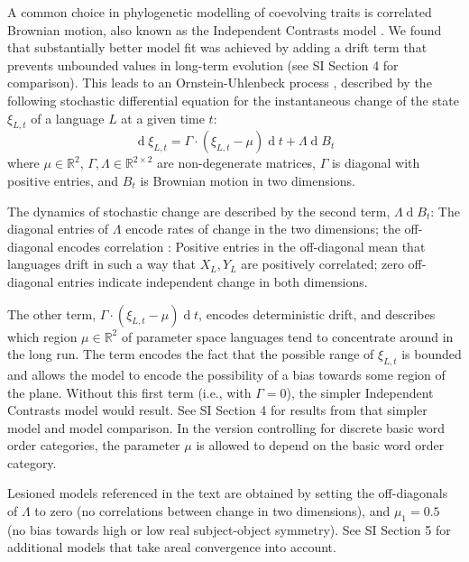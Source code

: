 \documentclass[11pt,a4paper]{article}
\begin{document}
A common choice in phylogenetic modelling of coevolving traits is correlated Brownian motion, also known as the Independent Contrasts model \citep{felsenstein1973maximum,freckleton2012fast}.
We found that substantially better model fit was achieved by adding a drift term that prevents unbounded values  in long-term evolution (see SI Section 4 for comparison).
This leads to an Ornstein-Uhlenbeck process \citep{felsenstein1988phylogenies,hansen1997stabilizing,blackwell2003bayesian}, described by the following stochastic differential equation for the instantaneous change of the state $\xi_{L,t}$ of a language $L$ at a given time $t$:
\begin{equation*}
    \operatorname{d}\xi_{L,t} = \Gamma \cdot (\xi_{L,t}-\mu) \operatorname{d}t + \Lambda \operatorname{d}B_t
\end{equation*}
where $\mu \in \mathbb{R}^2$,  $\Gamma, \Lambda \in \mathbb{R}^{2\times 2}$ are non-degenerate matrices, $\Gamma$ is diagonal with positive entries, and $B_t$ is Brownian motion in two dimensions.

The dynamics of stochastic change are described by the second term, $\Lambda \operatorname{d}B_t$:
The diagonal entries of $\Lambda$ encode rates of change in the two dimensions; the off-diagonal encodes correlation \citep{felsenstein1973maximum,freckleton2012fast}: Positive entries in the off-diagonal mean that languages drift in such a way that $X_L, Y_L$ are positively correlated; zero off-diagonal entries indicate independent change in both dimensions.



The other term, $\Gamma \cdot (\xi_{L,t}-\mu) \operatorname{d}t$, encodes deterministic drift, and describes which region $\mu \in \mathbb{R}^2$ of parameter space languages tend to concentrate around in the long run.
The term encodes the fact that the possible range of $\xi_{L,t}$ is bounded and allows the model to encode the possibility of a bias towards some region of the plane.
Without this first term (i.e., with $\Gamma =0$), the simpler Independent Contrasts model \citep{felsenstein1973maximum,freckleton2012fast} would result. See SI Section 4 for results from that simpler model and model comparison.
In the version controlling for discrete basic word order categories, the parameter $\mu$ is allowed to depend on the basic word order category.

Lesioned models referenced in the text are obtained by setting the off-diagonals of $\Lambda$ to zero (no correlations between change in two dimensions), and $\mu_1=0.5$ (no bias towards high or low real subject-object symmetry).
See SI Section 5 for additional models that take areal convergence into account.
\end{document}
